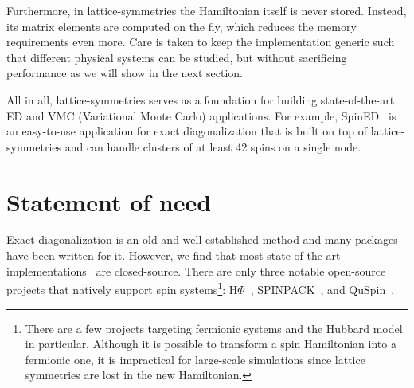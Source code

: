 Furthermore, in lattice-symmetries the Hamiltonian itself is never stored. Instead, its matrix elements are computed on the fly, which reduces the memory requirements even more. Care is taken to keep the implementation generic such that different physical systems can be studied, but without sacrificing performance as we will show in the next section.

All in all, lattice-symmetries serves as a foundation for building state-of-the-art ED and VMC (Variational Monte Carlo) applications. For example, SpinED~\cite{SpinED} is an easy-to-use application for exact diagonalization that is built on top of lattice-symmetries and can handle clusters of at least 42 spins on a single node.

\section{Statement of need}

Exact diagonalization is an old and well-established method and many packages have been written for it. However, we find that most state-of-the-art implementations~\cite{Wietek2018subla,Lauchl2019Kagome} are closed-source. There are only three notable open-source projects that natively support spin systems\footnote{%
There are a few projects targeting fermionic systems and the Hubbard model in particular. Although it is possible to transform a spin Hamiltonian into a fermionic one, it is impractical for large-scale simulations since lattice symmetries are lost in the new Hamiltonian.}: $\text{H}\Phi$~\cite{Kawamura2017quant}, SPINPACK~\cite{Schule2017Spinpack}, and QuSpin~\cite{Weinbe2017QuspinAPytho}.

